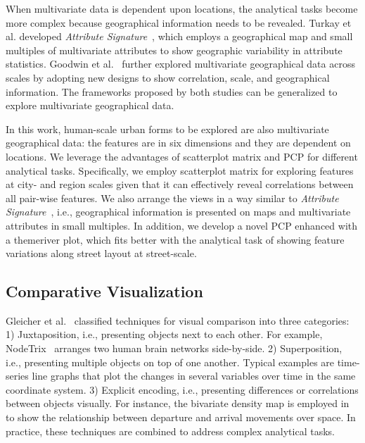 When multivariate data is dependent upon locations, the analytical tasks become more complex because geographical information needs to be revealed.
Turkay et al. developed \textit{Attribute Signature}~\cite{turkay2014attribute}, which employs a geographical map and small multiples of multivariate attributes to show geographic variability in attribute statistics.
Goodwin et al.~\cite{goodwin2015visualizing} further explored multivariate geographical data across scales by adopting new designs to show correlation, scale, and geographical information.
The frameworks proposed by both studies can be generalized to explore multivariate geographical data.

In this work, human-scale urban forms to be explored are also multivariate geographical data: the features are in six dimensions and they are dependent on locations.
We leverage the advantages of scatterplot matrix and PCP for different analytical tasks.
Specifically, we employ scatterplot matrix for exploring features at city- and region scales given that it can effectively reveal correlations between all pair-wise features.
We also arrange the views in a way similar to \textit{Attribute Signature}~\cite{turkay2014attribute}, i.e., geographical information is presented on maps and multivariate attributes in small multiples.
In addition, we develop a novel PCP enhanced with a themeriver plot, which fits better with the analytical task of showing feature variations along street layout at street-scale.

\subsection{Comparative Visualization}
Gleicher et al.~\cite{gleicher2011visual} classified techniques for visual comparison into three categories:
1) Juxtaposition, i.e., presenting objects next to each other. 
For example, NodeTrix~\cite{yang2016blockwise} arranges two human brain networks side-by-side.
2) Superposition, i.e., presenting multiple objects on top of one another.
Typical examples are time-series line graphs that plot the changes in several variables over time in the same coordinate system.
3) Explicit encoding, i.e., presenting differences or correlations between objects visually.
For instance, the bivariate density map is employed in~\cite{zeng2017visualizing} to show the relationship between departure and arrival movements over space.
In practice, these techniques are combined to address complex analytical tasks.

